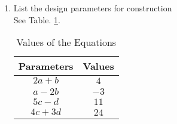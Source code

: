 \renewcommand{\theequation}{\theenumi}
\begin{enumerate}[label=\thesection.\arabic*.,ref=\thesection.\theenumi]


%
%
%
\item List the design parameters for construction
\label{const:table1}
\\
\solution See Table. \ref{table:table1}. 
%
\begin{table}[ht!]
\centering
\begin{tabular}{ |p{3cm}|p{3cm}|  }
\hline
Parameters & Values \\
\hline
$$2a+b $$ & $$ 4 $$\\
\hline
$$a-2b$$ & $$-3 $$\\
\hline
$$5c-d$$ & $$ 11 $$\\
\hline
$$4c+3d$$ & $$24$$\\
\hline
\end{tabular}
%
\caption{Values of the Equations}
\label{table:table1}	
\end{table}


\end{enumerate}
